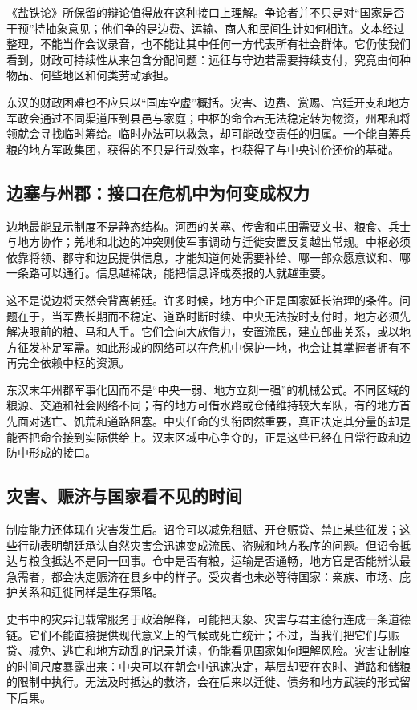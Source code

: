 《盐铁论》所保留的辩论值得放在这种接口上理解。争论者并不只是对“国家是否干预”持抽象意见；他们争的是边费、运输、商人和民间生计如何相连。文本经过整理，不能当作会议录音，也不能让其中任何一方代表所有社会群体。它仍使我们看到，财政可持续性从来包含分配问题：远征与守边若需要持续支付，究竟由何种物品、何些地区和何类劳动承担。

东汉的财政困难也不应只以“国库空虚”概括。灾害、边费、赏赐、宫廷开支和地方军政会通过不同渠道压到县邑与家庭；中枢的命令若无法稳定转为物资，州郡和将领就会寻找临时筹给。临时办法可以救急，却可能改变责任的归属。一个能自筹兵粮的地方军政集团，获得的不只是行动效率，也获得了与中央讨价还价的基础。

\subsection{边塞与州郡：接口在危机中为何变成权力}

边地最能显示制度不是静态结构。河西的关塞、传舍和屯田需要文书、粮食、兵士与地方协作；羌地和北边的冲突则使军事调动与迁徙安置反复越出常规。中枢必须依靠将领、郡守和边民提供信息，才能知道何处需要补给、哪一部众愿意议和、哪一条路可以通行。信息越稀缺，能把信息译成奏报的人就越重要。

这不是说边将天然会背离朝廷。许多时候，地方中介正是国家延长治理的条件。问题在于，当军费长期而不稳定、道路时断时续、中央无法按时支付时，地方必须先解决眼前的粮、马和人手。它们会向大族借力，安置流民，建立部曲关系，或以地方征发补足军需。如此形成的网络可以在危机中保护一地，也会让其掌握者拥有不再完全依赖中枢的资源。

东汉末年州郡军事化因而不是“中央一弱、地方立刻一强”的机械公式。不同区域的粮源、交通和社会网络不同；有的地方可借水路或仓储维持较大军队，有的地方首先面对逃亡、饥荒和道路阻塞。中央任命的头衔固然重要，真正决定其分量的却是能否把命令接到实际供给上。汉末区域中心争夺的，正是这些已经在日常行政和边防中形成的接口。

\subsection{灾害、赈济与国家看不见的时间}

制度能力还体现在灾害发生后。诏令可以减免租赋、开仓赈贷、禁止某些征发；这些行动表明朝廷承认自然灾害会迅速变成流民、盗贼和地方秩序的问题。但诏令抵达与粮食抵达不是同一回事。仓中是否有粮，运输是否通畅，地方官是否能辨认最急需者，都会决定赈济在县乡中的样子。受灾者也未必等待国家：亲族、市场、庇护关系和迁徙同样是生存策略。

史书中的灾异记载常服务于政治解释，可能把天象、灾害与君主德行连成一条道德链。它们不能直接提供现代意义上的气候或死亡统计；不过，当我们把它们与赈贷、减免、逃亡和地方动乱的记录并读，仍能看见国家如何理解风险。灾害让制度的时间尺度暴露出来：中央可以在朝会中迅速决定，基层却要在农时、道路和储粮的限制中执行。无法及时抵达的救济，会在后来以迁徙、债务和地方武装的形式留下后果。

